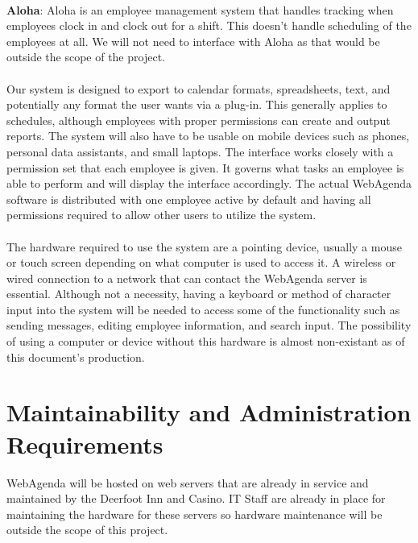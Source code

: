 \documentclass[letterpaper,12pt]{report}
\begin{document}
\paragraph*{}\hspace{0.6cm}\textbf{Aloha}: Aloha is an employee management system that handles tracking when employees clock in and clock out for a shift. This doesn’t handle scheduling of the employees at all. We will not need to interface with Aloha as that would be outside the scope of the project.

\paragraph*{}\hspace{0.6cm}
	Our system is designed to export to calendar formats, spreadsheets, text, and potentially any format the user wants via a plug-in. This generally applies to schedules, although employees with proper permissions can create and output reports. The system will also have to be usable on mobile devices such as phones, personal data assistants, and small laptops. The interface works closely with a permission set that each employee is given. It governs what tasks an employee is able to perform and will display the interface accordingly. The actual WebAgenda software is distributed with one employee active by default and having all permissions required to allow other users to utilize the system.
\paragraph*{}\hspace{0.6cm}The hardware required to use the system are a pointing device, usually a mouse or touch screen depending on what computer is used to access it. A wireless or wired connection to a network that can contact the WebAgenda server is essential. Although not a necessity, having a keyboard or method of character input into the system will be needed to access some of the functionality such as sending messages, editing employee information, and search input. The possibility of using a computer or device without this hardware is almost non-existant as of this document's production.
	

\pagebreak

\section{Maintainability and Administration Requirements}
\hspace{1cm}WebAgenda will be hosted on web servers that are already in service and maintained by the Deerfoot Inn and Casino.  IT Staff are already in place for maintaining the hardware for these servers so hardware maintenance will be outside the scope of this project.
\end{document}
